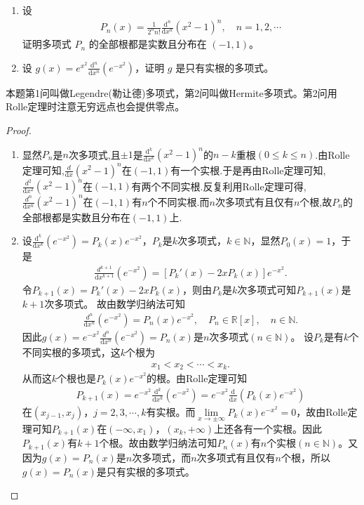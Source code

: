 \documentclass[../../main.tex]{subfiles}
\begin{document}
\begin{example}
\begin{enumerate}
\item 设
\begin{align}
P_n(x)=\frac{1}{2^n n!}\frac{\mathrm{d}^n}{\mathrm{d}x^n}(x^2 - 1)^n, \quad n = 1, 2, \cdots
\end{align}
证明多项式 \( P_n \) 的全部根都是实数且分布在 \( (-1, 1) \)。

\item 设 \( g(x)=e^{x^2}\frac{\mathrm{d}^n}{\mathrm{d}x^n}(e^{-x^2}) \)，证明 \( g \) 是只有实根的多项式。
\end{enumerate}
\end{example}
\begin{note}
本题第1问叫做Legendre(勒让德)多项式，第2问叫做Hermite多项式。第2问用Rolle定理时注意无穷远点也会提供零点。
\end{note}
\begin{proof}
\begin{enumerate}
\item 显然$P_n$是$n$次多项式,且$\pm 1$是$\frac{\mathrm{d}^k}{\mathrm{d}x^k}(x^2-1)^n$的$n-k$重根$(0\leqslant k\leqslant n)$.由Rolle定理可知,$\frac{d}{\mathrm{d}x}(x^2-1)^n$在$(-1,1)$有一个实根.于是再由Rolle定理可知,$\frac{d^2}{\mathrm{d}x^2}(x^2-1)^n$在$(-1,1)$有两个不同实根.反复利用Rolle定理可得,$\frac{d^n}{\mathrm{d}x^n}(x^2-1)^n$在$(-1,1)$有$n$个不同实根.而$n$次多项式有且仅有$n$个根,故$P_n$的全部根都是实数且分布在$(-1,1)$上.

\item 设$\frac{\mathrm{d}^k}{\mathrm{d}x^k}(e^{-x^2}) = P_k(x)e^{-x^2}$，$P_k$是$k$次多项式，$k\in \mathbb{N}$，显然$P_0(x) = 1$，于是
\begin{align*}
\frac{d^{k+1}}{\mathrm{d}x^{k+1}}(e^{-x^2}) = \left[ P_k'(x) - 2xP_k(x) \right] e^{-x^2}.
\end{align*}
令$P_{k+1}(x) = P_k'(x) - 2xP_k(x)$，则由$P_k$是$k$次多项式可知$P_{k+1}(x)$是$k+1$次多项式。
故由数学归纳法可知
\begin{align*}
\frac{d^n}{\mathrm{d}x^n}(e^{-x^2}) = P_n(x)e^{-x^2}, \quad P_n \in \mathbb{R}[x], \quad n \in \mathbb{N}.
\end{align*}
因此$g(x) = e^{-x^2}\frac{d^n}{\mathrm{d}x^n}(e^{-x^2}) = P_n(x)$是$n$次多项式$(n \in \mathbb{N})$。
设$P_k$是有$k$个不同实根的多项式，这$k$个根为
\begin{align*}
x_1 < x_2 < \cdots < x_k.
\end{align*}
从而这$k$个根也是$P_k(x)e^{-x^2}$的根。由Rolle定理可知
\begin{align*}
P_{k+1}(x) = e^{-x^2}\frac{\mathrm{d}^k}{\mathrm{d}x^k}(e^{-x^2}) = e^{-x^2}\frac{\mathrm{d}}{\mathrm{d}x}\left( P_k(x)e^{-x^2} \right)
\end{align*}
在$(x_{j-1}, x_j)$，$j=2,3,\cdots,k$有实根。而$\lim\limits_{x \rightarrow \pm \infty} P_k(x)e^{-x^2} = 0$，故由Rolle定理可知$P_{k+1}(x)$在$(-\infty, x_1)$，$(x_k, +\infty)$上还各有一个实根。因此$P_{k+1}(x)$有$k+1$个根。故由数学归纳法可知$P_n(x)$有$n$个实根$(n \in \mathbb{N})$。又因为$g(x) = P_n(x)$是$n$次多项式，而$n$次多项式有且仅有$n$个根，所以$g(x) = P_n(x)$是只有实根的多项式。
\end{enumerate}
\end{proof}
\end{document}
